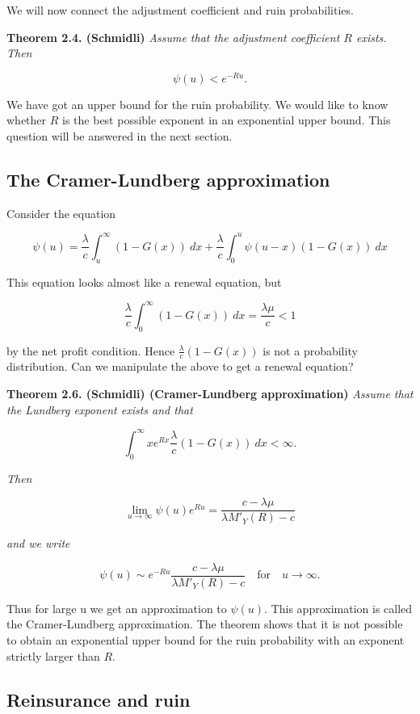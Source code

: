 \documentclass[a4paper,12pt,openany]{book}
\begin{document}
We will now connect the adjustment coefficient and ruin probabilities.

\textbf{Theorem 2.4. (Schmidli)} \emph{Assume that the adjustment coefficient \(R\) exists. Then}

\[
\psi(u)<e^{-Ru}.
\]

We have got an upper bound for the ruin probability. We would like to know whether \(R\) is the best possible exponent in an exponential upper bound. This question will be answered in the next section.

\hypertarget{the-cramer-lundberg-approximation}{%
\subsection{The Cramer-Lundberg approximation}\label{the-cramer-lundberg-approximation}}

Consider the equation

\[
\psi(u)=\frac{\lambda}{c}\int_u^\infty (1-G(x))\ dx+\frac{\lambda}{c}\int_0^u\psi(u-x)(1-G(x))\ dx
\]

This equation looks almost like a renewal equation, but

\[
\frac{\lambda}{c}\int_0^\infty (1-G(x))\ dx=\frac{\lambda \mu}{c}<1
\]

by the net profit condition. Hence \(\frac{\lambda}{c}(1-G(x))\) is not a probability distribution. Can we manipulate the above to get a renewal equation?

\textbf{Theorem 2.6. (Schmidli) (Cramer-Lundberg approximation)} \emph{Assume that the Lundberg exponent exists and that}

\[
\int_0^\infty xe^{Rx}\frac{\lambda}{c}(1-G(x))\ dx<\infty.
\]

\emph{Then}

\[
\lim_{u\to\infty} \psi(u)e^{Ru}=\frac{c-\lambda \mu}{\lambda M'_Y(R)-c}
\]

\emph{and we write}

\[
\psi(u)\sim e^{-Ru}\frac{c-\lambda \mu}{\lambda M'_Y(R)-c} \quad \text{for}\quad u\to\infty.
\]

Thus for large u we get an approximation to \(\psi(u)\). This approximation is called the Cramer-Lundberg approximation. The theorem shows that it is not possible to obtain an exponential upper bound for the ruin probability with an exponent strictly larger than \(R\).

\hypertarget{reinsurance-and-ruin}{%
\subsection{Reinsurance and ruin}\label{reinsurance-and-ruin}}
\end{document}

